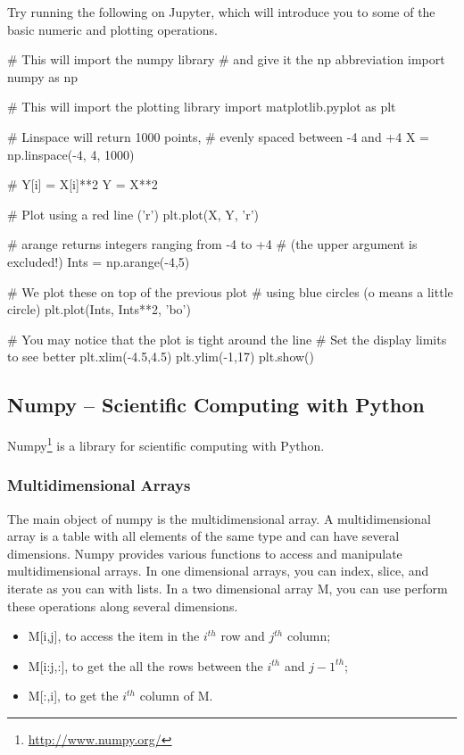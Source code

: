 \begin{exercise}
Try running the following on Jupyter, which will introduce you to some of the basic numeric and plotting operations.

\begin{python}
# This will import the numpy library
# and give it the np abbreviation
import numpy as np

# This will import the plotting library
import matplotlib.pyplot as plt

# Linspace will return 1000 points,
# evenly spaced between -4 and +4
X = np.linspace(-4, 4, 1000)

# Y[i] = X[i]**2
Y = X**2

# Plot using a red line ('r')
plt.plot(X, Y, 'r')

# arange returns integers ranging from -4 to +4
# (the upper argument is excluded!)
Ints = np.arange(-4,5)

# We plot these on top of the previous plot
# using blue circles (o means a little circle)
plt.plot(Ints, Ints**2, 'bo')

# You may notice that the plot is tight around the line
# Set the display limits to see better
plt.xlim(-4.5,4.5)
plt.ylim(-1,17)
plt.show()
\end{python}
\end{exercise}

\subsection{Numpy -- Scientific Computing with Python}

Numpy\footnote{\url{http://www.numpy.org/}} is a library for scientific computing with Python.

\subsubsection{Multidimensional Arrays}

The main object of numpy is the multidimensional array. A multidimensional array is a table with all elements of the same type and can have several dimensions. Numpy provides various functions to access and manipulate multidimensional arrays. In one dimensional arrays, you can index, slice, and iterate as you can with lists. In a two dimensional array M, you can use perform these operations along several dimensions.

\begin{itemize}
 \item M[i,j], to access the item in the $i^{th}$ row and $j^{th}$ column; 
 \item M[i:j,:], to get the all the rows between the $i^{th}$ and $j-1^{th}$;
 \item M[:,i], to get the $i^{th}$ column of M.
\end{itemize}

